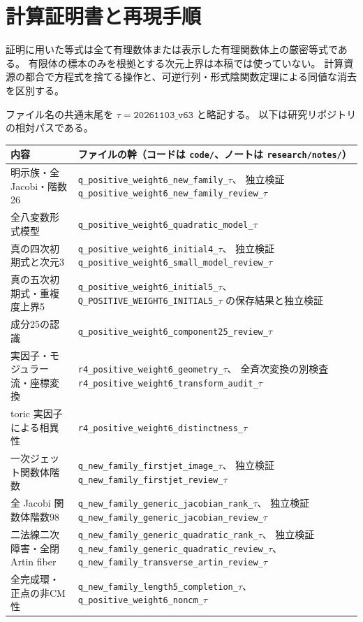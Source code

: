 \documentclass[11pt,a4paper]{ltjsarticle}
\theoremstyle{remark}
\begin{document}
\section{計算証明書と再現手順}\label{app:cert}

証明に用いた等式は全て有理数体または表示した有理関数体上の厳密等式である。
有限体の標本のみを根拠とする次元上界は本稿では使っていない。
計算資源の都合で方程式を捨てる操作と、可逆行列・形式陰関数定理による同値な消去を区別する。

ファイル名の共通末尾を $\tau=\texttt{20261103\_v63}$ と略記する。
以下は研究リポジトリの相対パスである。
\begin{longtable}{>{\raggedright\arraybackslash}p{}>{\raggedright\arraybackslash}p{}}
\toprule
内容 & ファイルの幹（コードは \texttt{code/}、ノートは \texttt{research/notes/}）\\
\midrule\endhead
明示族・全 Jacobi・階数26
 & \texttt{q\_positive\_weight6\_new\_family\_}\(\tau\)、
   独立検証 \texttt{q\_positive\_weight6\_new\_family\_review\_}\(\tau\)\\
全八変数形式模型
 & \texttt{q\_positive\_weight6\_quadratic\_model\_}\(\tau\)\\
真の四次初期式と次元3
 & \texttt{q\_positive\_weight6\_initial4\_}\(\tau\)、
   独立検証 \texttt{q\_positive\_weight6\_small\_model\_review\_}\(\tau\)\\
真の五次初期式・重複度上界5
 & \texttt{q\_positive\_weight6\_initial5\_}\(\tau\)、
   \texttt{Q\_POSITIVE\_WEIGHT6\_INITIAL5\_}\(\tau\) の保存結果と独立検証\\
成分25の認識
 & \texttt{q\_positive\_weight6\_component25\_review\_}\(\tau\)\\
実因子・モジュラー流・座標変換
 & \texttt{r4\_positive\_weight6\_geometry\_}\(\tau\)、
   全斉次変換の別検査 \texttt{r4\_positive\_weight6\_transform\_audit\_}\(\tau\)\\
toric 実因子による相異性
 & \texttt{r4\_positive\_weight6\_distinctness\_}\(\tau\)\\
一次ジェット関数体階数
 & \texttt{q\_new\_family\_firstjet\_image\_}\(\tau\)、
   独立検証 \texttt{q\_new\_family\_firstjet\_review\_}\(\tau\)\\
全 Jacobi 関数体階数98
 & \texttt{q\_new\_family\_generic\_jacobian\_rank\_}\(\tau\)、
   独立検証 \texttt{q\_new\_family\_generic\_jacobian\_review\_}\(\tau\)\\
二法線二次障害・全閉 Artin fiber
 & \texttt{q\_new\_family\_generic\_quadratic\_rank\_}\(\tau\)、
   独立検証 \texttt{q\_new\_family\_generic\_quadratic\_review\_}\(\tau\)、
   \texttt{q\_new\_family\_transverse\_artin\_review\_}\(\tau\)\\
全完成環・正点の非CM性
 & \texttt{q\_new\_family\_length5\_completion\_}\(\tau\)、
   \texttt{q\_positive\_weight6\_noncm\_}\(\tau\)\\
\bottomrule
\end{longtable}
\end{document}
